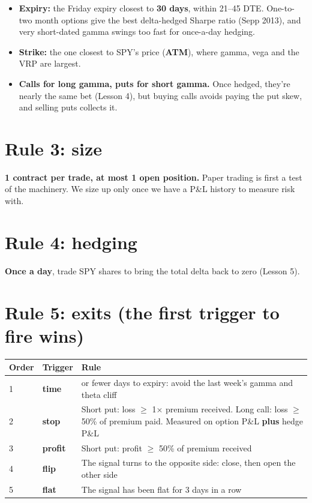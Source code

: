 \documentclass{article}
\begin{document}
\begin{itemize}

\item \textbf{Expiry:} the Friday expiry closest to \textbf{30 days}, within 21--45 DTE. One-to-two month options give the best delta-hedged Sharpe ratio (Sepp 2013), and very short-dated gamma swings too fast for once-a-day hedging.

\item \textbf{Strike:} the one closest to SPY's price (\textbf{ATM}), where gamma, vega and the VRP are largest.

\item \textbf{Calls for long gamma, puts for short gamma.} Once hedged, they're nearly the same bet (Lesson 4), but buying calls avoids paying the put skew, and selling puts collects it.

\end{itemize}

\section{Rule 3: size}

\textbf{1 contract per trade, at most 1 open position.} Paper trading is first a test of the machinery. We size up only once we have a P\&L history to measure risk with.

\section{Rule 4: hedging}

\textbf{Once a day}, trade SPY shares to bring the total delta back to zero (Lesson 5).

\section{Rule 5: exits (the first trigger to fire wins)}

\begin{center}\small
\begin{tabularx}{\linewidth}{l l >{\raggedright\arraybackslash}X}
\toprule
\textbf{Order} & \textbf{Trigger} & \textbf{Rule} \\
\midrule
1 & \textbf{time} & 7 or fewer days to expiry: avoid the last week's gamma and theta cliff \\
2 & \textbf{stop} & Short put: loss \ensuremath{\geq} 1\ensuremath{\times} premium received. Long call: loss \ensuremath{\geq} 50\% of premium paid. Measured on option P\&L \textbf{plus} hedge P\&L \\
3 & \textbf{profit} & Short put: profit \ensuremath{\geq} 50\% of premium received \\
4 & \textbf{flip} & The signal turns to the opposite side: close, then open the other side \\
5 & \textbf{flat} & The signal has been flat for 3 days in a row \\
\bottomrule
\end{tabularx}
\end{center}
\end{document}
